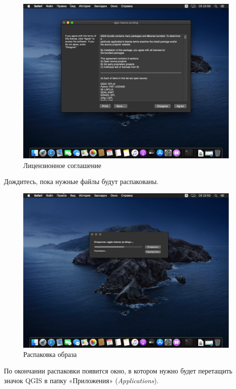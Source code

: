 \documentclass[
  12pt,
]{book}
\begin{document}
\begin{figure}
\centering
\includegraphics{images/Index0/mac02.png}
\caption{Лицензионное соглашение}
\end{figure}

Дождитесь, пока нужные файлы будут распакованы.

\begin{figure}
\centering
\includegraphics{images/Index0/mac03.png}
\caption{Распаковка образа}
\end{figure}

По окончании распаковки появится окно, в котором нужно будет перетащить значок QGIS в папку «Приложения» (\emph{Applications}).
\end{document}
